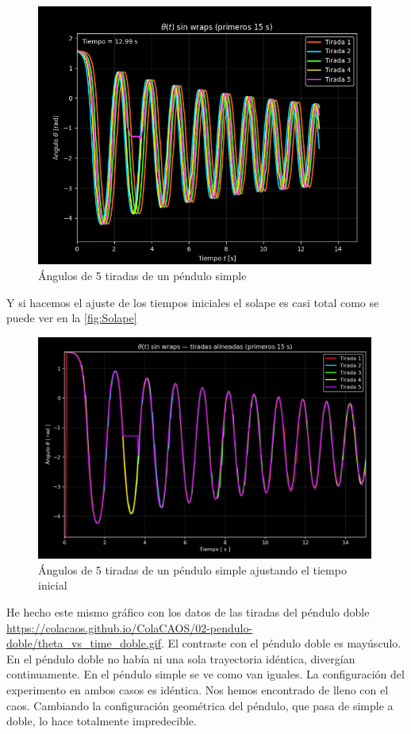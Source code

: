 \documentclass[
  10pt,
  a4paper,
  DIV=11,
  numbers=noendperiod,
  open=any]{scrreprt}
\numberwithin{equation}{chapter}
\numberwithin{equation}{section}
\renewcommand{\[}{\begin{equation}}
\renewcommand{\]}{\end{equation}}
\begin{document}
\begin{figure}[h]
  \centering
  \includegraphics[width=0.99\textwidth]{02-pendulo-doble/theta_vs_time.png}
  \caption{Ángulos de 5 tiradas de un péndulo simple}
\end{figure}


Y si hacemos el ajuste de los tiempos iniciales el solape es casi total como se puede ver en la \autoref{fig:Solape}
\begin{figure}[h]
  \centering
  \includegraphics[width=0.99\textwidth]{02-pendulo-doble/theta_alineadas_sin_wraps.png}
  \caption{Ángulos de 5 tiradas de un péndulo simple ajustando el tiempo inicial}
  \label{fig:Solape}
\end{figure}



He hecho este mismo gráfico con los datos de las tiradas del péndulo
doble \url{https://colacaos.github.io/ColaCAOS/02-pendulo-doble/theta_vs_time_doble.gif}. El contraste con el péndulo doble es mayúsculo. En el péndulo
doble no había ni una sola trayectoria idéntica, divergían
continuamente. En el péndulo simple se ve como van iguales. La configuración del experimento en ambos casos es idéntica. Nos hemos encontrado de lleno con el caos. Cambiando la configuración geométrica del péndulo, que pasa de simple a doble, lo hace totalmente impredecible. 
\end{document}
